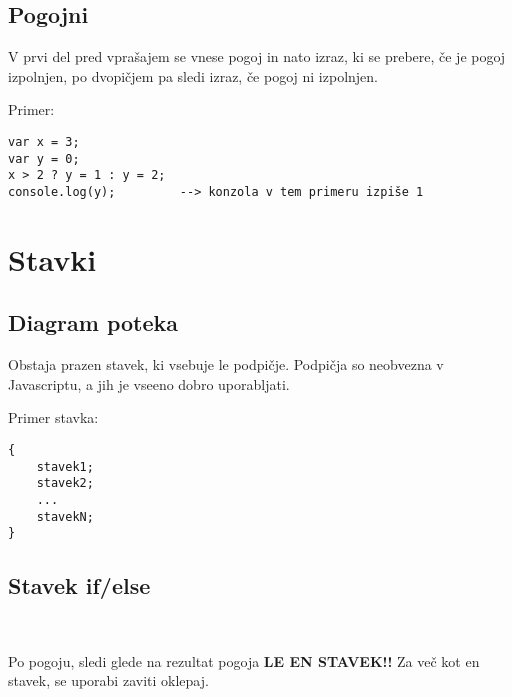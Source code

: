 \subsection{Pogojni}

{\centering{}\par}

V prvi del pred vprašajem se vnese pogoj in nato izraz, ki se prebere, če je pogoj izpolnjen, po dvopičjem pa sledi izraz, če pogoj ni izpolnjen.

Primer:
\begin{verbatim}
var x = 3;
var y = 0;
x > 2 ? y = 1 : y = 2;
console.log(y);			--> konzola v tem primeru izpiše 1
\end{verbatim}

\section{Stavki}

\subsection*{Diagram poteka}


Obstaja prazen stavek, ki vsebuje le podpičje. Podpičja so neobvezna v Javascriptu, a jih je vseeno dobro uporabljati.\

Primer stavka:
\begin{verbatim}
{
	stavek1;
	stavek2;
	...
	stavekN;	
}
\end{verbatim}

\pagebreak

\subsection{Stavek if/else}\

{\centering{}\par}

Po pogoju, sledi glede na rezultat pogoja \textbf{LE EN STAVEK!!} Za več kot en stavek, se uporabi zaviti oklepaj.\

{\centering{}\par}

